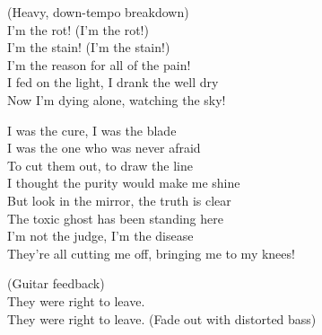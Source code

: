 \begin{lyrics}
(Heavy, down-tempo breakdown)\\
I’m the rot! (I'm the rot!)\\
I’m the stain! (I'm the stain!)\\
I’m the reason for all of the pain!\\
I fed on the light, I drank the well dry\\
Now I’m dying alone, watching the sky!

I was the cure, I was the blade\\
I was the one who was never afraid\\
To cut them out, to draw the line\\
I thought the purity would make me shine\\
But look in the mirror, the truth is clear\\
The toxic ghost has been standing here\\
I’m not the judge, I’m the disease\\
They’re all cutting me off, bringing me to my knees!

(Guitar feedback)\\
They were right to leave.\\
They were right to leave.
(Fade out with distorted bass)
\end{lyrics}

